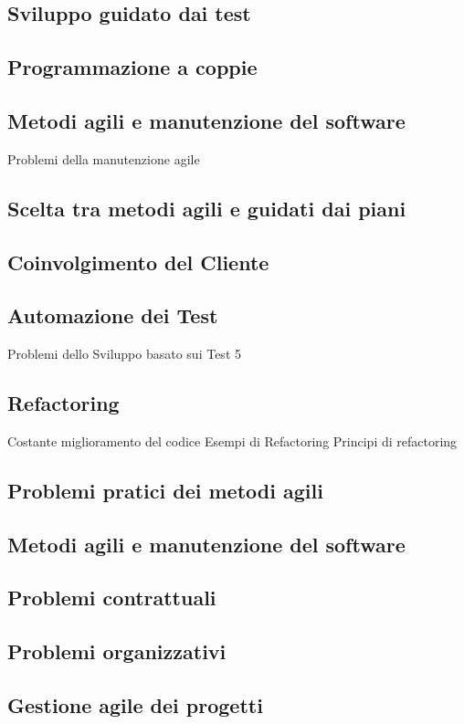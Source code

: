 \documentclass{article}
\begin{document}
	\subsection{Sviluppo guidato dai test}
	\subsection{Programmazione a coppie}
	\subsection{Metodi agili e manutenzione del software}
	Problemi della manutenzione agile
	\subsection{Scelta tra metodi agili e guidati dai piani}
	\subsection{Coinvolgimento del Cliente}
	\subsection{Automazione dei Test}
	Problemi dello Sviluppo basato sui Test
	5\subsection{Refactoring}
	Costante miglioramento del codice
	Esempi di Refactoring
	Principi di refactoring
	\subsection{Problemi pratici dei metodi agili}
	\subsection{Metodi agili e manutenzione del software}
	\subsection{Problemi contrattuali}
	\subsection{Problemi organizzativi}
	\subsection{Gestione agile dei progetti}
\end{document}
